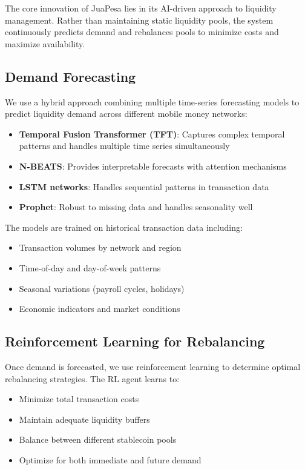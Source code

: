 \documentclass[11pt,a4paper]{article}
\begin{document}
The core innovation of JuaPesa lies in its AI-driven approach to liquidity management. Rather than maintaining static liquidity pools, the system continuously predicts demand and rebalances pools to minimize costs and maximize availability.

\subsection{Demand Forecasting}

We use a hybrid approach combining multiple time-series forecasting models to predict liquidity demand across different mobile money networks:

\begin{itemize}
    \item \textbf{Temporal Fusion Transformer (TFT)}: Captures complex temporal patterns and handles multiple time series simultaneously
    \item \textbf{N-BEATS}: Provides interpretable forecasts with attention mechanisms
    \item \textbf{LSTM networks}: Handles sequential patterns in transaction data
    \item \textbf{Prophet}: Robust to missing data and handles seasonality well
\end{itemize}

The models are trained on historical transaction data including:
\begin{itemize}
    \item Transaction volumes by network and region
    \item Time-of-day and day-of-week patterns
    \item Seasonal variations (payroll cycles, holidays)
    \item Economic indicators and market conditions
\end{itemize}

\subsection{Reinforcement Learning for Rebalancing}

Once demand is forecasted, we use reinforcement learning to determine optimal rebalancing strategies. The RL agent learns to:

\begin{itemize}
    \item Minimize total transaction costs
    \item Maintain adequate liquidity buffers
    \item Balance between different stablecoin pools
    \item Optimize for both immediate and future demand
\end{itemize}
\end{document}
